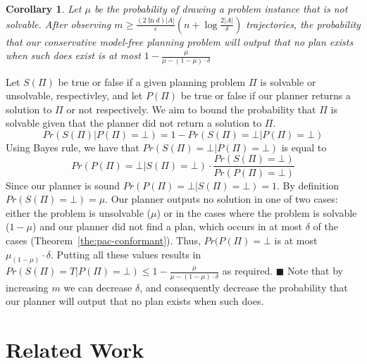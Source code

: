 \documentclass[letterpaper]{article}
\newtheorem{corollary}{Corollary}
\newenvironment{proof}{\noindent{\bf Proof:~~}}{\qed}
\newcommand{\qed}{\hfill\ensuremath{\blacksquare}}
\newcommand{\solvable}{\textit{S}}
\newcommand{\plannable}{\textit{P}}
\newcommand{\true}{\textit{T}}
\newcommand{\false}{\textit{$\bot$}}
\begin{document}
\begin{corollary}
	Let $\mu$ be the probability of drawing a problem instance that is not solvable. 
	After observing $m\geq\frac{(2\ln  d)|A|}{\epsilon}(n+\log\frac{2|A|}{\delta})$
	trajectories, the probability that our conservative model-free planning problem
	will output that no plan exists when such does exist 
	is at most $1-\frac{\mu}{\mu-(1-\mu)\cdot\delta}$ 
\end{corollary}
\begin{proof}
	Let $\solvable(\Pi)$ be true or false if  a given planning problem $\Pi$ is solvable or unsolvable, respectivley, 
	and let $\plannable(\Pi)$ be true or false if our planner returns a solution to $\Pi$ or not respectively. We aim to bound the probability that $\Pi$ is solvable given that the planner did not return a solution to $\Pi$. 
	\[  Pr(\solvable(\Pi)|\plannable(\Pi)=\false)=1-Pr(\solvable(\Pi)=\false|\plannable(\Pi)=\false) \]
	Using Bayes rule, we have that $Pr(\solvable(\Pi)=\false|\plannable(\Pi)=\false)$ is equal to 
	\[ 	Pr(\plannable(\Pi)=\false|\solvable(\Pi)=\false)\cdot \frac{Pr(\solvable(\Pi)=\false)}{Pr(\plannable(\Pi)=\false)} \]
	Since our planner is sound $Pr(\plannable(\Pi)=\false|\solvable(\Pi)=\false)=1$. 
	By definition $Pr(\solvable(\Pi)=\false)=\mu$. Our planner outputs no solution in one of two cases: either the problem is unsolvable ($\mu$) or in the cases where 
	the problem is solvable ($1-\mu$) and our planner did not find a plan, which occurs 
	in at most $\delta$ of the cases (Theorem~\ref{the:pac-conformant}). Thus, $Pr(\plannable(\Pi)=\false$ is at most $\mu_(1-\mu)\cdot \delta$. Putting all these values 
	results in 
	$Pr(\solvable(\Pi)=\true|\plannable(\Pi)=\false)\leq 1-\frac{\mu}{\mu-(1-\mu)\cdot\delta}$ as required.
\end{proof}
Note that by increasing $m$ we can decrease $\delta$, and consequently decrease the probability
that our planner will output that no plan exists when such does. 



\section{Related Work}
\end{document}
